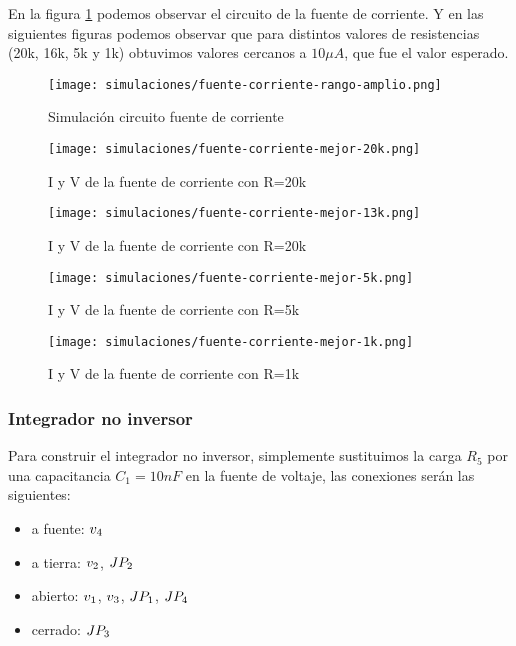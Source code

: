 En la figura \ref{fig:sim-fuente-corriente} podemos observar el circuito de la fuente de corriente. Y en las siguientes figuras podemos observar que para distintos valores de resistencias (20k, 16k, 5k y 1k) obtuvimos valores cercanos a $10\mu A$, que fue el valor esperado.

\begin{figure}[ht]
    \centering
    \texttt{[image: simulaciones/fuente-corriente-rango-amplio.png]}
    \caption{Simulación circuito fuente de corriente}
    \label{fig:sim-fuente-corriente}
\end{figure}
\begin{figure}[ht]
    \centering
    \texttt{[image: simulaciones/fuente-corriente-mejor-20k.png]}
    \caption{I y V de la fuente de corriente con R=20k}
    \label{fig:sim-fuente-corriente-20k}
\end{figure}
\begin{figure}[ht]
    \centering
    \texttt{[image: simulaciones/fuente-corriente-mejor-13k.png]}
    \caption{I y V de la fuente de corriente con R=20k}
    \label{fig:sim-fuente-corriente-13k}
\end{figure}
\begin{figure}[ht]
    \centering
    \texttt{[image: simulaciones/fuente-corriente-mejor-5k.png]}
    \caption{I y V de la fuente de corriente con R=5k}
    \label{fig:sim-fuente-corriente-5k}
\end{figure}
\begin{figure}[ht]
    \centering
    \texttt{[image: simulaciones/fuente-corriente-mejor-1k.png]}
    \caption{I y V de la fuente de corriente con R=1k}
    \label{fig:sim-fuente-corriente-1k}
\end{figure}


\FloatBarrier
\subsubsection{Integrador no inversor}

Para construir el integrador no inversor, simplemente sustituimos la carga $R_5$ por una capacitancia $C_1 = 10nF$ en la fuente de voltaje, las conexiones serán las siguientes:

\begin{itemize}
    \item a fuente: $\volt{4}$
    \item a tierra: $\volt{2}$, $\jumper{2}$
    \item abierto: $\volt{1}$, $\volt{3}$, $\jumper{1}$, $\jumper{4}$
    \item cerrado: $\jumper{3}$
\end{itemize}

